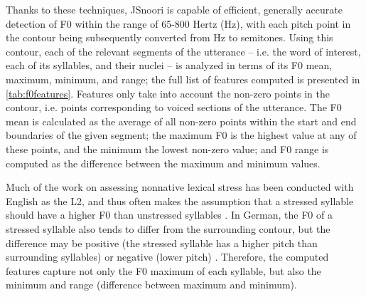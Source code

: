 	Thanks to these techniques, JSnoori is capable of efficient, generally accurate detection of F0 
	within the range of 65-800 Hertz (Hz), with each pitch point in the contour being subsequently converted from Hz to semitones.
	Using this contour, each of the relevant segments of the utterance -- i.e. the word of interest, each of its syllables, and their nuclei -- is analyzed in terms of its F0 mean, maximum, minimum, and range;
	the full list of features computed is presented in \cref{tab:f0features}.
	Features only take into account the non-zero points in the contour, i.e. points corresponding to voiced sections of the utterance. The F0 mean is calculated as the average of all non-zero points within the start and end boundaries of the given segment; the maximum F0 is the highest value at any of these points, and the minimum the lowest non-zero value; and F0 range is computed as the difference between the maximum and minimum values. 
	
	
	Much of the work on assessing nonnative lexical stress has been conducted with English as the L2, and thus often makes the assumption that a stressed syllable should have a higher F0 than unstressed syllables \citep{Bonneau2011}. In German, the F0 of a stressed syllable also tends to differ from the surrounding contour, but the difference may be positive (the stressed syllable has a higher pitch than surrounding syllables) or negative (lower pitch) \citep[p.~267]{Cutler2005}. 		%
	Therefore, the computed features
	capture not only the F0 maximum of each syllable, but also the minimum and range (difference between maximum and minimum). %
	 
	



